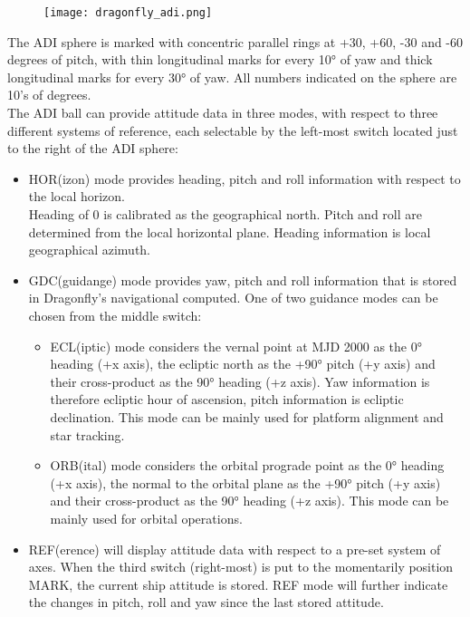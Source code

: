 \documentclass[Orbiter User Manual.tex]{subfiles}
\begin{document}
\begin{figure}[H]
  \centering
  \texttt{[image: dragonfly\_adi.png]}
\end{figure}

\noindent
The ADI sphere is marked with concentric parallel rings at +30, +60, -30 and -60 degrees of pitch, with thin longitudinal marks for every 10° of yaw and thick longitudinal marks for every 30° of yaw. All numbers indicated on the sphere are 10's of degrees.\\
The ADI ball can provide attitude data in three modes, with respect to three different systems of reference, each selectable by the left-most switch located just to the right of the ADI sphere:

\begin{itemize}
\item HOR(izon) mode provides heading, pitch and roll information with respect to the local horizon.\\
Heading of 0 is calibrated as the geographical north. Pitch and roll are determined from the local horizontal plane. Heading information is local geographical azimuth.
\item GDC(guidange) mode provides yaw, pitch and roll information that is stored in Dragonfly's navigational computed. One of two guidance modes can be chosen from the middle switch:

\begin{itemize}
\item ECL(iptic) mode considers the vernal point at MJD 2000 as the 0° heading (+x axis), the ecliptic north as the +90° pitch (+y axis) and their cross-product as the 90° heading (+z axis). Yaw information is therefore ecliptic hour of ascension, pitch information is ecliptic declination. This mode can be mainly used for platform alignment and star tracking.
\item ORB(ital) mode considers the orbital prograde point as the 0° heading (+x axis), the normal to the orbital plane as the +90° pitch (+y axis) and their cross-product as the 90° heading (+z axis). This mode can be mainly used for orbital operations.
\end{itemize}

\item REF(erence) will display attitude data with respect to a pre-set system of axes. When the third switch (right-most) is put to the momentarily position MARK, the current ship attitude is stored. REF mode will further indicate the changes in pitch, roll and yaw since the last stored attitude.
\end{itemize}
\end{document}
